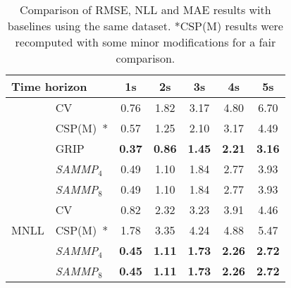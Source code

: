 \documentclass[a4paper, 10pt, conference]{ieeeconf}      %
\begin{document}
\begin{table}
    \centering
    \caption{Comparison of RMSE, NLL and MAE results with baselines using the same dataset.
     *CSP(M) results were recomputed with some minor modifications for a fair comparison.}
    \begin{tabular}{l|l|ccccc}
        \hline
        \multicolumn{2}{l|}{\hspace{-5pt}Time horizon}                & 1s   & 2s   & 3s   & 4s   & 5s   \\
        \hline\hspace{-3pt}
        \multirow{3}{*}{\hspace{-5pt}RMSE\hspace{-3pt}} &\hspace{-3pt}CV~\cite{Mercat2019}      & 0.76 & 1.82 & 3.17 & 4.80 & 6.70 \\
                              &\hspace{-3pt}CSP(M)~\cite{Deo2018}*    & 0.57 & 1.25 & 2.10 & 3.17 & 4.49 \\
                              &\hspace{-3pt}GRIP~\cite{Li2019}        & \textbf{0.37} & \textbf{0.86} & \textbf{1.45} & \textbf{2.21} & \textbf{3.16} \\
                              &\hspace{-3pt}\textit{SAMMP$_4$}          & 0.49 & 1.10 & 1.84 & 2.77 & 3.93\\
                              &\hspace{-3pt}\textit{SAMMP$_8$}          & 0.49 & 1.10 & 1.84 & 2.77 & 3.93\\
        \hline
        \multirow{3}{*}{\hspace{-5pt}MNLL\hspace{-3pt}} &\hspace{-3pt}CV~\cite{Mercat2019}      & 0.82 & 2.32 & 3.23 & 3.91 & 4.46\\
                              &\hspace{-3pt}CSP(M)~\cite{Deo2018}*    & 1.78 & 3.35 & 4.24 & 4.88 & 5.47\\
                              &\hspace{-3pt}\textit{SAMMP$_4$}          & \textbf{0.45} & \textbf{1.11} & \textbf{1.73} & \textbf{2.26} & \textbf{2.72}\\
                              &\hspace{-3pt}\textit{SAMMP$_8$}          & \textbf{0.45} & \textbf{1.11} & \textbf{1.73} & \textbf{2.26} & \textbf{2.72}\\

\end{tabular}
\end{table}
\end{document}
